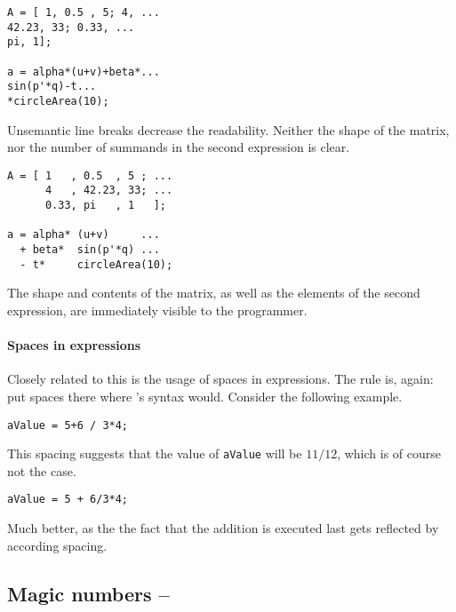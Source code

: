 \hfill
\begin{minipage}[t]{.45\textwidth}
\begin{lstlisting}[framerule=2pt,rulecolor=\color{badred}]
A = [ 1, 0.5 , 5; 4, ...
42.23, 33; 0.33, ...
pi, 1];

a = alpha*(u+v)+beta*...
sin(p'*q)-t...
*circleArea(10);
\end{lstlisting}
Unsemantic line breaks decrease the readability. Neither the shape of the
matrix, nor the number of summands in the second expression is clear.
\end{minipage}
\hfill
\begin{minipage}[t]{.45\textwidth}
\begin{lstlisting}[framerule=2pt,rulecolor=\color{goodgreen}]
A = [ 1   , 0.5  , 5 ; ...
      4   , 42.23, 33; ...
      0.33, pi   , 1   ];

a = alpha* (u+v)     ...
  + beta*  sin(p'*q) ...
  - t*     circleArea(10);
\end{lstlisting}
The shape and contents of the matrix, as well as the elements of the second expression, are immediately visible to the programmer.
\end{minipage}
\hfill

\paragraph{Spaces in expressions} Closely related to this is the usage of spaces in expressions. The rule is, again: put spaces there where \matlab{}'s syntax would. Consider the following example.

\hfill
\begin{minipage}[t]{.45\textwidth}
\begin{lstlisting}[framerule=2pt,rulecolor=\color{badred}]
aValue = 5+6 / 3*4;
\end{lstlisting}
This spacing suggests that the value of \lstinline!aValue! will be $11/12$, which is of course not the case.
\end{minipage}
\hfill
\begin{minipage}[t]{.45\textwidth}
\begin{lstlisting}[framerule=2pt,rulecolor=\color{goodgreen}]
aValue = 5 + 6/3*4;
\end{lstlisting}
Much better, as the the fact that the addition is executed last gets reflected by according spacing.
\end{minipage}
\hfill



\subsection{Magic numbers -- \cleansymbol\cleansymbol\cleansymbol}

